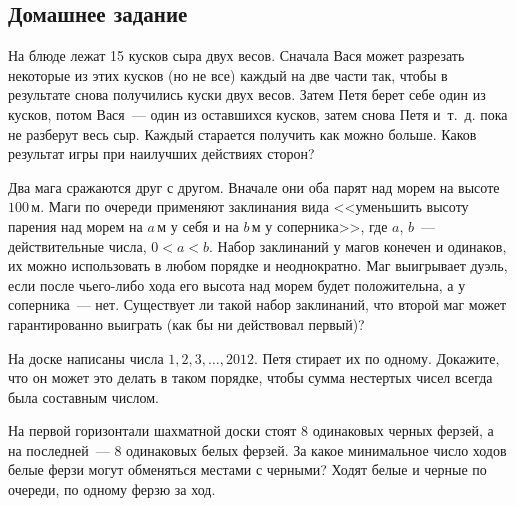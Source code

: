 

\subsection*{Домашнее задание}



\begin{problems}

\item
На блюде лежат 15 кусков сыра двух весов.
Сначала Вася может разрезать некоторые из этих кусков (но не все) каждый на две
части так, чтобы в результате снова получились куски двух весов.
Затем Петя берет себе один из кусков, потом Вася~--- один из оставшихся кусков,
затем снова Петя и~т.~д. пока не разберут весь сыр.
Каждый старается получить как можно больше.
Каков результат игры при наилучших действиях сторон?

\item
Два мага сражаются друг с другом.
Вначале они оба парят над морем на высоте $100\,\text{м}$.
Маги по очереди применяют заклинания вида <<уменьшить высоту парения над морем
на $a\,\text{м}$ у себя и на $b\,\text{м}$ у соперника>>, где $a$, $b$~---
действительные числа, $0 < a < b$.
Набор заклинаний у магов конечен и одинаков, их можно использовать в любом
порядке и неоднократно.
Маг выигрывает дуэль, если после чьего-либо хода его высота над морем будет
положительна, а у соперника~--- нет.
Существует ли такой набор заклинаний, что второй маг может гарантированно
выиграть (как бы ни действовал первый)?

\item
На доске написаны числа $1, 2, 3, \ldots, 2012$.
Петя стирает их по одному.
Докажите, что он может это делать в таком порядке, чтобы сумма нестертых чисел
всегда была составным числом.

\item
На первой горизонтали шахматной доски стоят 8 одинаковых черных ферзей,
а на последней~--- 8 одинаковых белых ферзей.
За какое минимальное число ходов белые ферзи могут обменяться местами
с черными?
Ходят белые и черные по очереди, по одному ферзю за ход.


\end{problems}
